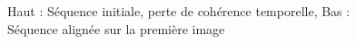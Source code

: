 \begin{figure}[H]
\begin{tabular}{ccccc}
\end{tabular}
\caption{Haut : Séquence initiale, perte de cohérence temporelle, Bas : Séquence alignée sur la première image}
\label{fig_coherence}
\end{figure}

